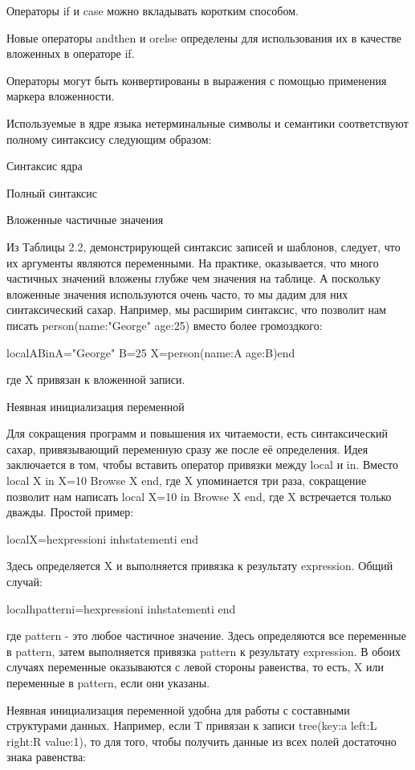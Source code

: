 Операторы if и case можно вкладывать коротким способом.

Новые операторы andthen и orelse определены для использования их в качестве вложенных в операторе if.

Операторы могут быть конвертированы в выражения с помощью применения маркера вложенности.

Используемые в ядре языка нетерминальные символы и семантики соответствуют полному синтаксису следующим образом:

Синтаксис ядра

Полный синтаксис

Вложенные частичные значения

Из Таблицы 2.2, демонстрирующей синтаксис записей и шаблонов, следует, что их аргументы являются переменными. На практике, оказывается, что много частичных значений вложены глубже чем значения на таблице. А поскольку вложенные значения используются очень часто, то мы дадим для них синтаксический сахар. Например, мы расширим синтаксис, что позволит нам писать person(name:"George" age:25) вместо более громоздкого:

localABinA="George" B=25 X=person(name:A age:B)end

где X привязан к вложенной записи.

Неявная инициализация переменной

Для сокращения программ и повышения их читаемости, есть синтаксический сахар, привязывающий переменную сразу же после её определения. Идея заключается в том, чтобы вставить оператор привязки между local и in. Вместо local X in X=10 {Browse X} end, где X упоминается три раза, сокращение позволит нам написать local X=10 in {Browse X} end, где X встречается только дважды. Простой пример:

localX=hexpressioni inhstatementi end

Здесь определяется X и выполняется привязка к результату expression. Общий случай:

localhpatterni=hexpressioni inhstatementi end

где pattern - это любое частичное значение. Здесь определяются все переменные в pattern, затем выполняется привязка pattern к результату expression. В обоих случаях переменные оказываются с левой стороны равенства, то есть, X или переменные в pattern, если они указаны.

Неявная инициализация переменной удобна для работы с составными структурами данных. Например, если T привязан к записи  tree(key:a left:L right:R value:1), то для того, чтобы получить данные из всех полей достаточно знака равенства:

